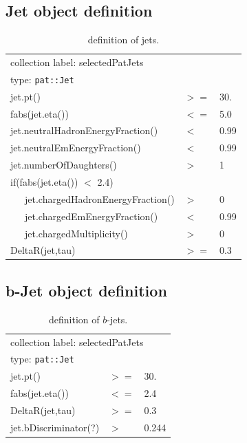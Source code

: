 \clearpage

\subsection{Jet object definition}

\begin{table}[htb]
  \caption{definition of jets.}
   \label{table:jetobjdefinition}
  \begin{center}
    \ttfamily\scriptsize\selectfont
    \begin{tabular}{|l|ll|}
      \hline
      \multicolumn{3}{|l|}{ collection label: selectedPatJets}\\
      \multicolumn{3}{|l|}{ type: \texttt{pat::Jet}}\\
      \hline
      jet.pt() & $>=$ & 30. \\
      fabs(jet.eta()) & $<=$ & 5.0 \\
      jet.neutralHadronEnergyFraction() & $<$ &  0.99 \\
      jet.neutralEmEnergyFraction() & $<$ & 0.99 \\
      jet.numberOfDaughters() & $>$& 1 \\
      if(fabs(jet.eta()) $<$ 2.4) && \\
      ~~~jet.chargedHadronEnergyFraction() & $>$ & 0 \\
      ~~~jet.chargedEmEnergyFraction() & $<$ & 0.99 \\
      ~~~jet.chargedMultiplicity() & $>$ & 0 \\
      DeltaR(jet,tau) & $>=$ & 0.3 \\
      \hline
    \end{tabular}
  \end{center}
\end{table}

\subsection{b-Jet object definition}

\begin{table}[htb]
  \caption{definition of $b$-jets.}
  \label{table:bjetobjdefinition}
  \begin{center}
  \ttfamily\scriptsize\selectfont
  \begin{tabular}{|l|ll|}
    \hline
    \multicolumn{3}{|l|}{ collection label: selectedPatJets}\\
    \multicolumn{3}{|l|}{ type: \texttt{pat::Jet}}\\
    \hline
    jet.pt() & $>=$ &  30. \\
    fabs(jet.eta()) & $<=$ & 2.4 \\
    DeltaR(jet,tau) & $>=$ & 0.3 \\
    jet.bDiscriminator(?) & $>$ & 0.244 \\
    \hline
  \end{tabular}
  \end{center}
\end{table}

